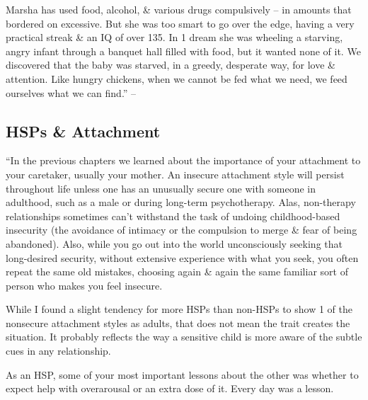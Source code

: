 \documentclass{article}
\numberwithin{equation}{section}
\begin{document}
Marsha has used food, alcohol, \& various drugs compulsively -- in amounts that bordered on excessive. But she was too smart to go over the edge, having a very practical streak \& an IQ of over 135. In 1 dream she was wheeling a starving, angry infant through a banquet hall filled with food, but it wanted none of it. We discovered that the baby was starved, in a greedy, desperate way, for love \& attention. Like hungry chickens, when we cannot be fed what we need, we feed ourselves what we can find.'' -- \cite[pp. 100--103]{Aron2013}

\subsection{HSPs \& Attachment}
``In the previous chapters we learned about the importance of your attachment to your caretaker, usually your mother. An insecure attachment style will persist throughout life unless one has an unusually secure one with someone in adulthood, such as a male or during long-term psychotherapy. Alas, non-therapy relationships sometimes can't withstand the task of undoing childhood-based insecurity (the avoidance of intimacy or the compulsion to merge \& fear of being abandoned). Also, while you go out into the world unconsciously seeking that long-desired security, without extensive experience with what you seek, you often repeat the same old mistakes, choosing again \& again the same familiar sort of person who makes you feel insecure.

While I found a slight tendency for more HSPs than non-HSPs to show 1 of the nonsecure attachment styles as adults, that does not mean the trait creates the situation. It probably reflects the way a sensitive child is more aware of the subtle cues in any relationship.

As an HSP, some of your most important lessons about the other was whether to expect help with overarousal or an extra dose of it. Every day was a lesson.
\end{document}

